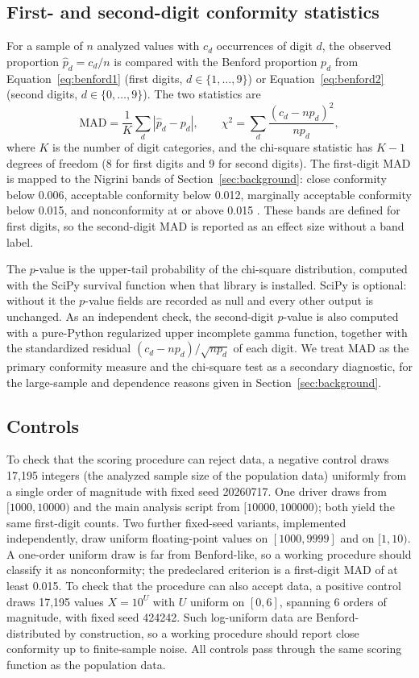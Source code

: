 \documentclass[sigconf,nonacm]{acmart}
\begin{document}
\subsection{First- and second-digit conformity statistics}
For a sample of \(n\) analyzed values with \(c_d\) occurrences of digit \(d\), the observed proportion \(\hat p_d=c_d/n\) is compared with the Benford proportion \(p_d\) from Equation~\eqref{eq:benford1} (first digits, \(d\in\{1,\ldots,9\}\)) or Equation~\eqref{eq:benford2} (second digits, \(d\in\{0,\ldots,9\}\)). The two statistics are
\begin{equation}
  \mathrm{MAD}=\frac{1}{K}\sum_{d}\left|\hat p_d-p_d\right|,
  \qquad
  \chi^2=\sum_{d}\frac{(c_d-np_d)^2}{np_d},
\end{equation}
where \(K\) is the number of digit categories, and the chi-square statistic \cite{pearson1900} has \(K-1\) degrees of freedom (8 for first digits and 9 for second digits). The first-digit MAD is mapped to the Nigrini bands of Section~\ref{sec:background}: close conformity below 0.006, acceptable conformity below 0.012, marginally acceptable conformity below 0.015, and nonconformity at or above 0.015 \cite{nigrini2012}. These bands are defined for first digits, so the second-digit MAD is reported as an effect size without a band label.

The \(p\)-value is the upper-tail probability of the chi-square distribution, computed with the SciPy survival function when that library is installed. SciPy is optional: without it the \(p\)-value fields are recorded as null and every other output is unchanged. As an independent check, the second-digit \(p\)-value is also computed with a pure-Python regularized upper incomplete gamma function, together with the standardized residual \((c_d-np_d)/\sqrt{np_d}\) of each digit. We treat MAD as the primary conformity measure and the chi-square test as a secondary diagnostic, for the large-sample and dependence reasons given in Section~\ref{sec:background}.

\subsection{Controls}
To check that the scoring procedure can reject data, a negative control draws 17,195 integers (the analyzed sample size of the population data) uniformly from a single order of magnitude with fixed seed 20260717. One driver draws from \([1000,10000)\) and the main analysis script from \([10000,100000)\); both yield the same first-digit counts. Two further fixed-seed variants, implemented independently, draw uniform floating-point values on \([1000,9999]\) and on \([1,10)\). A one-order uniform draw is far from Benford-like, so a working procedure should classify it as nonconformity; the predeclared criterion is a first-digit MAD of at least 0.015. To check that the procedure can also accept data, a positive control draws 17,195 values \(X=10^U\) with \(U\) uniform on \([0,6]\), spanning 6 orders of magnitude, with fixed seed 424242. Such log-uniform data are Benford-distributed by construction, so a working procedure should report close conformity up to finite-sample noise. All controls pass through the same scoring function as the population data.
\end{document}
